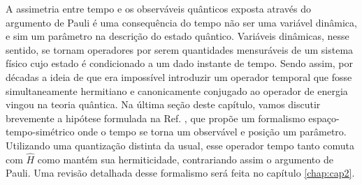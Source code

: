 A assimetria entre tempo e os observáveis quânticos exposta através do argumento de Pauli é uma consequência do tempo não ser uma variável dinâmica, e sim um parâmetro na descrição do estado quântico. Variáveis dinâmicas, nesse sentido, se tornam operadores por serem quantidades mensuráveis de um sistema físico cujo estado é condicionado a um dado instante de tempo. Sendo assim, por décadas a ideia de que era impossível introduzir um operador temporal que fosse simultaneamente hermitiano e canonicamente conjugado ao operador de energia vingou na teoria quântica. Na última seção deste capítulo, vamos discutir brevemente a hipótese formulada na Ref. \cite{Dias}, que propõe um formalismo espaço-tempo-simétrico onde o tempo se torna um observável e posição um parâmetro. Utilizando uma quantização distinta da usual, esse operador tempo tanto comuta com $\hat{H}$ como mantém sua hermiticidade, contrariando assim o argumento de Pauli. Uma revisão detalhada desse formalismo será feita no capítulo \ref{chap:cap2}.